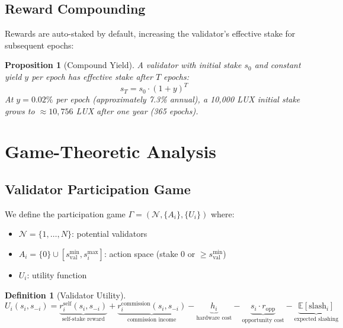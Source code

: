 \documentclass[11pt,a4paper]{article}
\newtheorem{proposition}[theorem]{Proposition}
\newtheorem{definition}{Definition}
\begin{document}
\subsection{Reward Compounding}

Rewards are auto-staked by default, increasing the validator's effective stake for subsequent epochs:

\begin{proposition}[Compound Yield]
A validator with initial stake $s_0$ and constant yield $y$ per epoch has effective stake after $T$ epochs:
\begin{equation}
    s_T = s_0 \cdot (1 + y)^T
\end{equation}
At $y = 0.02\%$ per epoch (approximately 7.3\% annual), a 10{,}000 LUX initial stake grows to $\approx 10{,}756$ LUX after one year (365 epochs).
\end{proposition}

\section{Game-Theoretic Analysis}\label{sec:game}

\subsection{Validator Participation Game}

We define the participation game $\Gamma = (\mathcal{N}, \{A_i\}, \{U_i\})$ where:
\begin{itemize}
    \item $\mathcal{N} = \{1, \ldots, N\}$: potential validators
    \item $A_i = \{0\} \cup [s^{\min}_{\text{val}}, s_i^{\max}]$: action space (stake 0 or $\geq s^{\min}_{\text{val}}$)
    \item $U_i$: utility function
\end{itemize}

\begin{definition}[Validator Utility]
\begin{equation}
    U_i(s_i, s_{-i}) = \underbrace{r_i^{\text{self}}(s_i, s_{-i})}_{\text{self-stake reward}} + \underbrace{r_i^{\text{commission}}(s_i, s_{-i})}_{\text{commission income}} - \underbrace{h_i}_{\text{hardware cost}} - \underbrace{s_i \cdot r_{\text{opp}}}_{\text{opportunity cost}} - \underbrace{\mathbb{E}[\text{slash}_i]}_{\text{expected slashing}}
\end{equation}
\end{definition}
\end{document}
